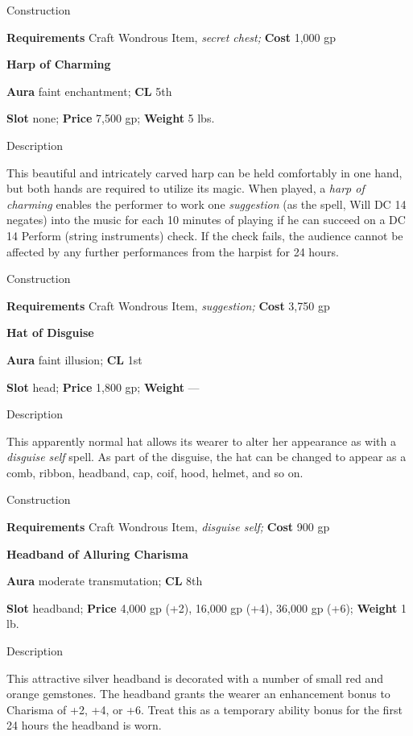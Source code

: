 Construction
				
\textbf{Requirements} Craft Wondrous Item,\textit{ secret chest;}\textbf{ Cost }1,000 gp
				
\textbf{Harp of Charming}
				
\textbf{Aura} faint enchantment;\textbf{ CL }5th
				
\textbf{Slot} none; \textbf{Price} 7,500 gp; \textbf{Weight} 5 lbs.
				
Description
				
This beautiful and intricately carved harp can be held comfortably in one hand, but both hands are required to utilize its magic. When played, a \textit{harp of charming} enables the performer to work one \textit{suggestion }(as the spell, Will DC 14 negates) into the music for each 10 minutes of playing if he can succeed on a DC 14 Perform (string instruments) check. If the check fails, the audience cannot be affected by any further performances from the harpist for 24 hours. 
				
Construction
				
\textbf{Requirements} Craft Wondrous Item,\textit{ suggestion;}\textbf{ Cost }3,750 gp
				
\textbf{Hat of Disguise}
				
\textbf{Aura} faint illusion;\textbf{ CL }1st
				
\textbf{Slot} head; \textbf{Price} 1,800 gp; \textbf{Weight }---
				
Description
				
This apparently normal hat allows its wearer to alter her appearance as with a \textit{disguise self} spell. As part of the disguise, the hat can be changed to appear as a comb, ribbon, headband, cap, coif, hood, helmet, and so on. 
				
Construction
				
\textbf{Requirements} Craft Wondrous Item,\textit{ disguise self;}\textbf{ Cost }900 gp
				
\textbf{Headband of Alluring Charisma}
				
\textbf{Aura} moderate transmutation; \textbf{CL} 8th
				
\textbf{Slot }headband; \textbf{Price} 4,000 gp (+2), 16,000 gp (+4), 36,000 gp (+6); \textbf{Weight} 1 lb.
				
Description
				
This attractive silver headband is decorated with a number of small red and orange gemstones. The headband grants the wearer an enhancement bonus to Charisma of +2, +4, or +6. Treat this as a temporary ability bonus for the first 24 hours the headband is worn.
				
